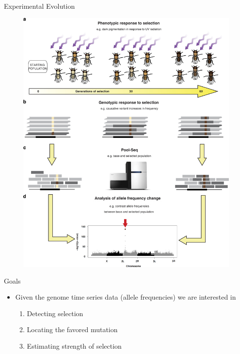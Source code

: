 \documentclass[t]{beamer} %
\begin{document}
\begin{frame}
Experimental Evolution
\begin{figure}
\includegraphics[trim={0 2.1in 0 0},clip, scale=0.6]{eg.jpg} 
\end{figure}
\end{frame}

\begin{frame}{Goals}
\begin{itemize}
\item Given the genome time series data (allele frequencies) we are interested 
in
\begin{enumerate}[I]
\item Detecting selection 
\item Locating the favored mutation
\item Estimating strength of selection
\end{enumerate}
\end{itemize}
\end{frame}
\end{document}
